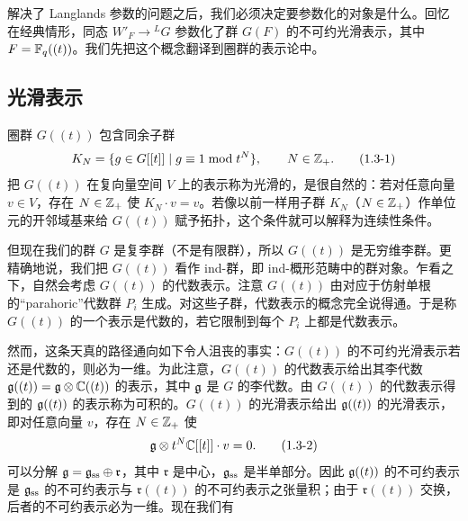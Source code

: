解决了 Langlands 参数的问题之后，我们必须决定要参数化的对象是什么。回忆在经典情形，同态 $W'_F\to{}^L G$ 参数化了群 $G(F)$ 的不可约光滑表示，其中 $F=\mathbb{F}_q((t))$。我们先把这个概念翻译到圈群的表示论中。

\subsection{光滑表示}

圈群 $G((t))$ 包含同余子群
\begin{equation}
    K_N=\{g\in G[[t]]\mid g\equiv 1\bmod t^N\},\qquad N\in\mathbb{Z}_+.
    \tag{1.3-1}
\end{equation}
把 $G((t))$ 在复向量空间 $V$ 上的表示称为光滑的，是很自然的：若对任意向量 $v\in V$，存在 $N\in\mathbb{Z}_+$ 使 $K_N\cdot v=v$。若像以前一样用子群 $K_N$（$N\in\mathbb{Z}_+$）作单位元的开邻域基来给 $G((t))$ 赋予拓扑，这个条件就可以解释为连续性条件。

但现在我们的群 $G$ 是复李群（不是有限群），所以 $G((t))$ 是无穷维李群。更精确地说，我们把 $G((t))$ 看作 ind-群，即 ind-概形范畴中的群对象。乍看之下，自然会考虑 $G((t))$ 的代数表示。注意 $G((t))$ 由对应于仿射单根的“parahoric”代数群 $P_i$ 生成。对这些子群，代数表示的概念完全说得通。于是称 $G((t))$ 的一个表示是代数的，若它限制到每个 $P_i$ 上都是代数表示。

然而，这条天真的路径通向如下令人沮丧的事实：$G((t))$ 的不可约光滑表示若还是代数的，则必为一维。为此注意，$G((t))$ 的代数表示给出其李代数 $\mathfrak{g}((t))=\mathfrak{g}\otimes\mathbb{C}((t))$ 的表示，其中 $\mathfrak{g}$ 是 $G$ 的李代数。由 $G((t))$ 的代数表示得到的 $\mathfrak{g}((t))$ 的表示称为可积的。$G((t))$ 的光滑表示给出 $\mathfrak{g}((t))$ 的光滑表示，即对任意向量 $v$，存在 $N\in\mathbb{Z}_+$ 使
\begin{equation}
    \mathfrak{g}\otimes t^N\mathbb{C}[[t]]\cdot v=0.
    \tag{1.3-2}
\end{equation}
可以分解 $\mathfrak{g}=\mathfrak{g}_{\mathrm{ss}}\oplus\mathfrak{r}$，其中 $\mathfrak{r}$ 是中心，$\mathfrak{g}_{\mathrm{ss}}$ 是半单部分。因此 $\mathfrak{g}((t))$ 的不可约表示是 $\mathfrak{g}_{\mathrm{ss}}$ 的不可约表示与 $\mathfrak{r}((t))$ 的不可约表示之张量积；由于 $\mathfrak{r}((t))$ 交换，后者的不可约表示必为一维。现在我们有

